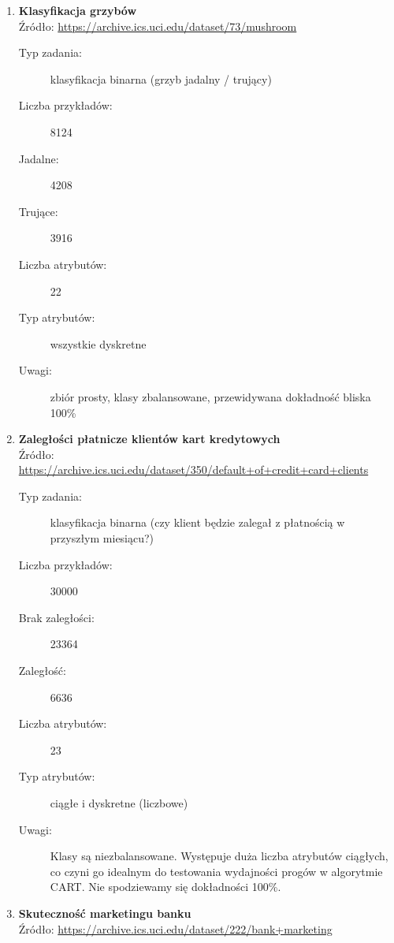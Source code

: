 \documentclass[a4paper]{article}
\begin{document}
\begin{enumerate}
    \item \textbf{Klasyfikacja grzybów} \\
    Źródło: \url{https://archive.ics.uci.edu/dataset/73/mushroom}

    \begin{description}
        \item[Typ zadania:] klasyfikacja binarna (grzyb jadalny / trujący)
        \item[Liczba przykładów:] 8124
        \item[Jadalne:] 4208
        \item[Trujące:] 3916
        \item[Liczba atrybutów:] 22
        \item[Typ atrybutów:] wszystkie dyskretne
        \item[Uwagi:] zbiór prosty, klasy zbalansowane, przewidywana dokładność bliska 100\%
    \end{description}

    \item \textbf{Zaległości płatnicze klientów kart kredytowych} \\
    Źródło: \url{https://archive.ics.uci.edu/dataset/350/default+of+credit+card+clients}

    \begin{description}
        \item[Typ zadania:] klasyfikacja binarna (czy klient będzie zalegał z płatnością w przyszłym miesiącu?)
        \item[Liczba przykładów:] 30000
        \item[Brak zaległości:] 23364
        \item[Zaległość:] 6636
        \item[Liczba atrybutów:] 23
        \item[Typ atrybutów:] ciągłe i dyskretne (liczbowe)
        \item[Uwagi:] Klasy są niezbalansowane. Występuje duża liczba atrybutów ciągłych, co czyni go idealnym do testowania wydajności progów w algorytmie CART. Nie spodziewamy się dokładności 100\%.
    \end{description}

     \item \textbf{Skuteczność marketingu banku} \\
    Źródło: \url{https://archive.ics.uci.edu/dataset/222/bank+marketing}


\end{enumerate}
\end{document}
